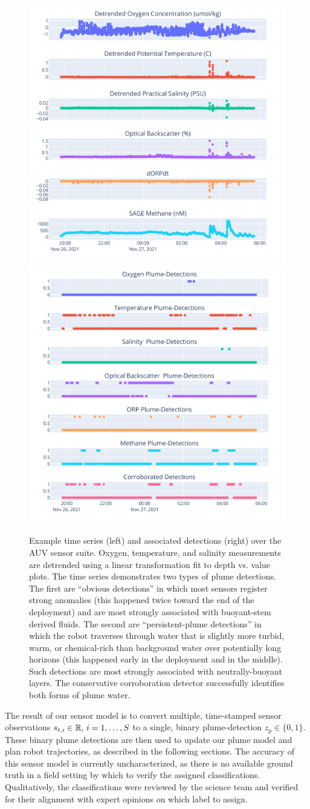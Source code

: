 \begin{figure} [h]
    \centering
    \includegraphics[width=0.45\columnwidth]{figures/binary_example_time.png}
    \hspace{.1in}
    \includegraphics[width=0.45\columnwidth]{figures/binary_example_detections.png}
    \caption{Example time series (left) and associated detections (right) over the AUV \Sentry sensor suite. Oxygen, temperature, and salinity measurements are detrended using a linear transformation fit to depth vs. value plots. The time series demonstrates two types of plume detections. The first are ``obvious detections'' in which most sensors register strong anomalies (this happened twice toward the end of the deployment) and are most strongly associated with buoyant-stem derived fluids. The second are ``persistent-plume detections'' in which the robot traverses through water that is slightly more turbid, warm, or chemical-rich than background water over potentially long horizons (this happened early in the deployment and in the middle). Such detections are most strongly associated with neutrally-buoyant layers. The conservative corroboration detector successfully identifies both forms of plume water.}
    \label{fig:detection_example}
\end{figure}
 
The result of our sensor model is to convert multiple, time-stamped sensor observations $s_{t, i} \in \mathbb{R}, \, i = 1, \dots, S$ to a single, binary plume-detection $z_{p} \in \{0, 1\}$. These binary plume detections are then used to update our plume model and plan robot trajectories, as described in the following sections. The accuracy of this sensor model is currently uncharacterized, as there is no available ground truth in a field setting by which to verify the assigned classifications. Qualitatively, the classifications were reviewed by the science team and verified for their alignment with expert opinions on which label to assign.



